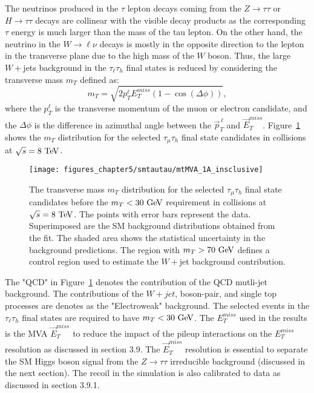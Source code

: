 The neutrinos produced in the $\tau$ lepton decays coming from the $Z\rightarrow\tau\tau$ or $H\rightarrow\tau\tau$ decays are collinear with the visible decay products as the corresponding $\tau$ energy is much larger than the mass of the tau lepton. On the other hand, the neutrino in the $W\rightarrow\ell\nu$ decays is mostly in the opposite direction to the lepton in the transverse plane due to the high mass of the $W$ boson. Thus, the large $W+$jets background in the $\tau_{\ell}\tau_{h}$ final states is reduced by considering the transverse mass $m_{T}$ defined as:
 \begin{equation} \label{eq:mt}
m_{T} = \sqrt{2p_{T}^{\ell}E_{T}^{miss}(1-\cos(\Delta \phi))},
\end{equation}
where the $p_{T}^{\ell}$ is the transverse momentum of the muon or electron candidate, and the $\Delta \phi$ is the difference in azimuthal angle between the $\vec{p}_{T}^{\,\ell}$ and $\vec{E}_{T}^{miss}$. Figure~\ref{fig:mt} shows the $m_{T}$ distribution for the selected  $\tau_{\mu}\tau_{h}$ final state candidates in collisions at $\sqrt{s}=8~\mathrm{Te\kern -0.1em V}$.
\begin{figure}[htbp]
\centering
\texttt{[image: figures\_chapter5/smtautau/mtMVA\_1A\_insclusive]}
\caption{The transverse mass $m_T$ distribution  for the selected $\tau_{\mu}\tau_{h}$ final state candidates before the $m_{T}<30~\mathrm{Ge\kern -0.1em V}$ requirement in collisions at $\sqrt{s}=8~\mathrm{Te\kern -0.1em V}$. The points with error bars represent the data. Superimposed are the SM background distributions obtained from the fit. The shaded area shows the statistical uncertainty in the background predictions. The region with $m_{T}>70~\mathrm{Ge\kern -0.1em V}$ defines a control region used to estimate the $W+$jet background contribution.}
\label{fig:mt}
\end{figure}
The "QCD" in Figure~\ref{fig:mt} denotes the contribution of the QCD mutli-jet background. The contributions of the $W+jet$, boson-pair, and single top processes are denotes as the "Electroweak" background. The selected events in the $\tau_{\ell}\tau_{h}$ final states are required to have $m_{T}<30~\mathrm{Ge\kern -0.1em V}$.  The $E_{T}^{miss}$ used in the results is the MVA  $\vec{E}_{T}^{miss}$ to reduce the impact of the pileup interactions on the $E_{T}^{miss}$ resolution as discussed in section 3.9. The $\vec{E}_{T}^{miss}$ resolution is essential to separate the SM Higgs boson signal from the $Z\rightarrow\tau\tau$ irreducible background (discussed in the next section). The recoil in the simulation is also calibrated to data as discussed in section 3.9.1.

